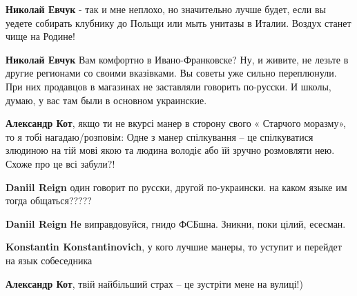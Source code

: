 \begin{itemize}
\begin{itemize}

\textbf{Николай Евчук} - так и мне неплохо, но значительно лучше будет, если вы
уедете собирать клубнику до Польщи или мыть унитазы в Италии. Воздух станет
чище на Родине!


\textbf{Николай Евчук} Вам комфортно в Ивано-Франковске? Ну, и живите, не
лезьте в другие регионами со своими вказівками. Вы советы уже сильно
переплюнули. При них продавцов в магазинах не заставляли говорить по-русски. И
школы, думаю, у вас там были в основном украинские.
\end{itemize}


\textbf{Александр Кот}, якщо ти не вкурсі манер в сторону свого « Старчого
моразму», то я тобі нагадаю/розповім: Одне з манер спілкування – це
спілкуватися злюдиною на тій мові якою та людина володіє або їй зручно
розмовляти нею. Схоже про це всі забули?!

\begin{itemize}

\textbf{Daniil Reign} один говорит по русски, другой по-украински. на каком языке им тогда общаться?????


\textbf{Daniil Reign} Не виправдовуйся, гнидо ФСБшна. Зникни, поки цілий, есесман.


\textbf{Konstantin Konstantinovich}, у кого лучшие манеры, то уступит и перейдет на язык собеседника


\textbf{Александр Кот}, твій найбільший страх – це зустріти мене на вулиці!)


\end{itemize}
\end{itemize}
